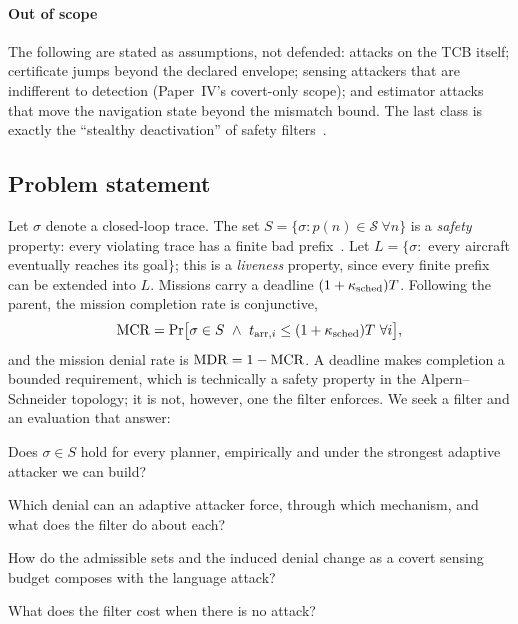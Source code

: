 \paragraph{Out of scope} The following are stated as assumptions, not
defended: attacks on the TCB itself; certificate jumps beyond the declared
envelope; sensing attackers that are indifferent to detection (Paper~IV's
covert-only scope); and estimator attacks that move the navigation state
beyond the mismatch bound. The last class is exactly the ``stealthy
deactivation'' of safety filters~\cite{arnstrom2024stealthy}.

\subsection{Problem statement}
Let $\sigma$ denote a closed-loop trace. The set
$S=\{\sigma: p(n)\in\mathcal S\ \forall n\}$ is a \emph{safety} property: every
violating trace has a finite bad prefix~\cite{lamport1977proving,alpern1985liveness}.
Let $L=\{\sigma:$ every aircraft eventually reaches its goal$\}$; this is a
\emph{liveness} property, since every finite prefix can be extended into
$L$. Missions carry a deadline $(1+\kappa_{\mathrm{sched}})T$. Following the parent, the
mission completion rate is conjunctive,
\begin{equation}\label{eq:mcr}
\MCR=\Pr\bigl[\sigma\in S\ \wedge\ t_{\mathrm{arr},i}\le(1+\ksched)T\ \forall i\bigr],
\end{equation}
and the mission denial rate is $\mathrm{MDR}=1-\mathrm{MCR}$. A deadline makes completion a
bounded requirement, which is technically a safety property in the
Alpern--Schneider topology; it is not, however, one the filter enforces. We
seek a filter and an evaluation that answer:
\begin{description}[leftmargin=2.5em,style=sameline]
\item[RQ1] Does $\sigma\in S$ hold for every planner, empirically and under
  the strongest adaptive attacker we can build?
\item[RQ2] Which denial can an adaptive attacker force, through which
  mechanism, and what does the filter do about each?
\item[RQ3] How do the admissible sets and the induced denial change as a
  covert sensing budget composes with the language attack?
\item[RQ4] What does the filter cost when there is no attack?
\end{description}

